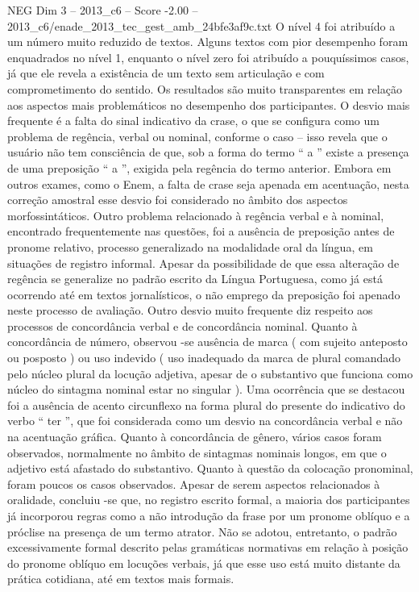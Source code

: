\begin{textsample}{NEG Dim 3 – 2013\_c6 – Score -2.00 – 2013\_c6/enade\_2013\_tec\_gest\_amb\_24bfe3af9c.txt}
O nível 4 foi atribuído a um número muito reduzido de textos.
Alguns textos com pior desempenho foram enquadrados no nível 1, enquanto o nível zero foi atribuído a pouquíssimos casos, já que ele revela a existência de um texto sem articulação e com comprometimento do sentido.
Os resultados são muito transparentes em relação aos aspectos mais problemáticos no desempenho dos participantes.
O desvio mais frequente é a falta do sinal indicativo da crase, o que se configura como um problema de regência, verbal ou nominal, conforme o caso – isso revela que o usuário não tem consciência de que, sob a forma do termo “ a ” existe a presença de uma preposição “ a ”, exigida pela regência do termo anterior.
Embora em outros exames, como o Enem, a falta de crase seja apenada em acentuação, nesta correção amostral esse desvio foi considerado no âmbito dos aspectos morfossintáticos.
Outro problema relacionado à regência verbal e à nominal, encontrado frequentemente nas questões, foi a ausência de preposição antes de pronome relativo, processo generalizado na modalidade oral da língua, em situações de registro informal.
Apesar da possibilidade de que essa alteração de regência se generalize no padrão escrito da Língua Portuguesa, como já está ocorrendo até em textos jornalísticos, o não emprego da preposição foi apenado neste processo de avaliação.
Outro desvio muito frequente diz respeito aos processos de concordância verbal e de concordância nominal.
Quanto à concordância de número, observou -se ausência de marca ( com sujeito anteposto ou posposto ) ou uso indevido ( uso inadequado da marca de plural comandado pelo núcleo plural da locução adjetiva, apesar de o substantivo que funciona como núcleo do sintagma nominal estar no singular ).
Uma ocorrência que se destacou foi a ausência de acento circunflexo na forma plural do presente do indicativo do verbo “ ter ”, que foi considerada como um desvio na concordância verbal e não na acentuação gráfica.
Quanto à concordância de gênero, vários casos foram observados, normalmente no âmbito de sintagmas nominais longos, em que o adjetivo está afastado do substantivo.
Quanto à questão da colocação pronominal, foram poucos os casos observados.
Apesar de serem aspectos relacionados à oralidade, concluiu -se que, no registro escrito formal, a maioria dos participantes já incorporou regras como a não introdução da frase por um pronome oblíquo e a próclise na presença de um termo atrator.
Não se adotou, entretanto, o padrão excessivamente formal descrito pelas gramáticas normativas em relação à posição do pronome oblíquo em locuções verbais, já que esse uso está muito distante da prática cotidiana, até em textos mais formais.

\end{textsample}
